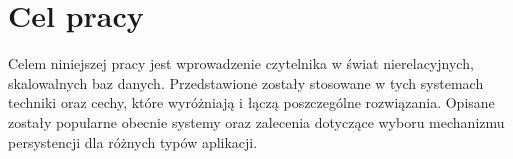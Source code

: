 \section{Cel pracy}

Celem niniejszej pracy jest wprowadzenie czytelnika w świat nierelacyjnych, skalowalnych baz danych.
Przedstawione zostały stosowane w tych systemach techniki oraz cechy, które wyróżniają i łączą poszczególne rozwiązania.
Opisane zostały popularne obecnie systemy oraz zalecenia dotyczące wyboru mechanizmu persystencji dla różnych typów aplikacji.